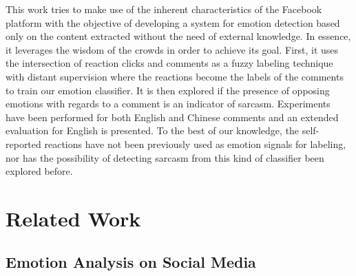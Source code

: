 \documentclass[12pt,a4paper]{report}
\theoremstyle{definition}
\begin{document}
\begin{CJK}{UTF8}{bsmi}
    \par This work tries to make use of the inherent characteristics of the Facebook platform with the objective of developing a system for emotion detection based only on the content extracted without the need of external knowledge.
    In essence, it leverages the wisdom of the crowds in order to achieve its goal.
    First, it uses the intersection of reaction clicks and comments as a fuzzy labeling technique with distant supervision where the reactions become the labels of the comments to train our emotion classifier.
    It is then explored if the presence of opposing emotions with regards to a comment is an indicator of sarcasm.
    Experiments have been performed for both English and Chinese comments and an extended evaluation for English is presented.
    To the best of our knowledge, the self-reported reactions have not been previously used as emotion signals for labeling, nor has the possibility of detecting sarcasm from this kind of classifier been explored before.


\chapter{Related Work}
    \section{Emotion Analysis on Social Media}
   

\end{CJK}
\end{document}
